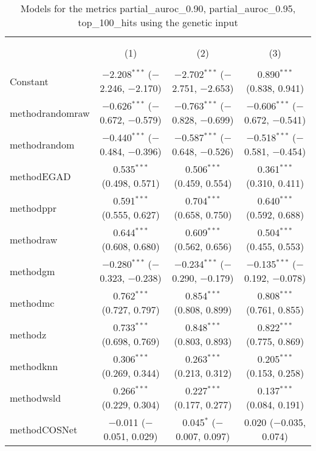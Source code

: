 
\begin{table}[!htbp] \centering 
  \caption{Models for the metrics partial_auroc_0.90, partial_auroc_0.95, top_100_hits using the genetic input} 
  \label{} 
\begin{tabular}{@{\extracolsep{5pt}}lccc} 
\\[-1.8ex]\hline 
\hline \\[-1.8ex] 
\\[-1.8ex] & (1) & (2) & (3)\\ 
\hline \\[-1.8ex] 
 Constant & $-$2.208$^{***}$ ($-$2.246, $-$2.170) & $-$2.702$^{***}$ ($-$2.751, $-$2.653) & 0.890$^{***}$ (0.838, 0.941) \\ 
  methodrandomraw & $-$0.626$^{***}$ ($-$0.672, $-$0.579) & $-$0.763$^{***}$ ($-$0.828, $-$0.699) & $-$0.606$^{***}$ ($-$0.672, $-$0.541) \\ 
  methodrandom & $-$0.440$^{***}$ ($-$0.484, $-$0.396) & $-$0.587$^{***}$ ($-$0.648, $-$0.526) & $-$0.518$^{***}$ ($-$0.581, $-$0.454) \\ 
  methodEGAD & 0.535$^{***}$ (0.498, 0.571) & 0.506$^{***}$ (0.459, 0.554) & 0.361$^{***}$ (0.310, 0.411) \\ 
  methodppr & 0.591$^{***}$ (0.555, 0.627) & 0.704$^{***}$ (0.658, 0.750) & 0.640$^{***}$ (0.592, 0.688) \\ 
  methodraw & 0.644$^{***}$ (0.608, 0.680) & 0.609$^{***}$ (0.562, 0.656) & 0.504$^{***}$ (0.455, 0.553) \\ 
  methodgm & $-$0.280$^{***}$ ($-$0.323, $-$0.238) & $-$0.234$^{***}$ ($-$0.290, $-$0.179) & $-$0.135$^{***}$ ($-$0.192, $-$0.078) \\ 
  methodmc & 0.762$^{***}$ (0.727, 0.797) & 0.854$^{***}$ (0.808, 0.899) & 0.808$^{***}$ (0.761, 0.855) \\ 
  methodz & 0.733$^{***}$ (0.698, 0.769) & 0.848$^{***}$ (0.803, 0.893) & 0.822$^{***}$ (0.775, 0.869) \\ 
  methodknn & 0.306$^{***}$ (0.269, 0.344) & 0.263$^{***}$ (0.213, 0.312) & 0.205$^{***}$ (0.153, 0.258) \\ 
  methodwsld & 0.266$^{***}$ (0.229, 0.304) & 0.227$^{***}$ (0.177, 0.277) & 0.137$^{***}$ (0.084, 0.191) \\ 
  methodCOSNet & $-$0.011 ($-$0.051, 0.029) & 0.045$^{*}$ ($-$0.007, 0.097) & 0.020 ($-$0.035, 0.074) \\ 

\end{tabular}
\end{table}
